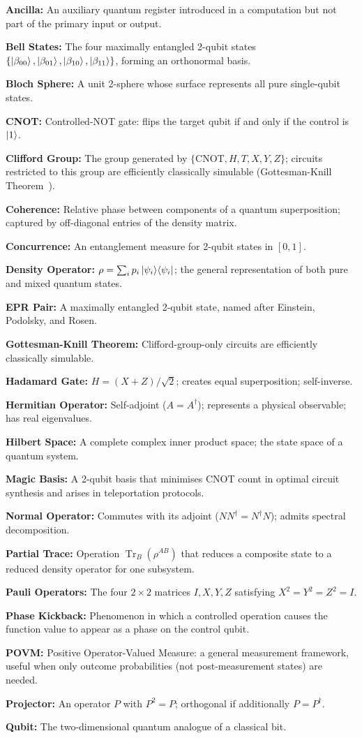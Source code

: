\documentclass[12pt, a4paper, oneside]{report}
\theoremstyle{plain}
\theoremstyle{definition}
\theoremstyle{remark}
\newcommand{\oket}[2]{\ket{#1}\!\bra{#2}}
\DeclareMathOperator{\Tr}{Tr}
\newcommand{\CNOT}{\mathrm{CNOT}}
\begin{document}
\newcommand{\gentry}[2]{\noindent\textbf{#1:} #2\medskip\par}

\gentry{Ancilla}{An auxiliary quantum register introduced in a computation but not part of
the primary input or output.}
\gentry{Bell States}{The four maximally entangled 2-qubit states
$\{\ket{\beta_{00}},\ket{\beta_{01}},\ket{\beta_{10}},\ket{\beta_{11}}\}$, forming an
orthonormal basis.}
\gentry{Bloch Sphere}{A unit 2-sphere whose surface represents all pure single-qubit states.}
\gentry{CNOT}{Controlled-NOT gate: flips the target qubit if and only if the control is
$\ket{1}$.}
\gentry{Clifford Group}{The group generated by $\{\CNOT, H, T, X, Y, Z\}$; circuits
restricted to this group are efficiently classically simulable
(Gottesman-Knill Theorem~\cite{gottesman1998}).}
\gentry{Coherence}{Relative phase between components of a quantum superposition; captured
by off-diagonal entries of the density matrix.}
\gentry{Concurrence}{An entanglement measure for 2-qubit states in $[0,1]$.}
\gentry{Density Operator}{$\rho = \sum_i p_i\oket{\psi_i}{\psi_i}$; the general
representation of both pure and mixed quantum states.}
\gentry{EPR Pair}{A maximally entangled 2-qubit state, named after Einstein, Podolsky, and
Rosen.}
\gentry{Gottesman-Knill Theorem}{Clifford-group-only circuits are efficiently classically
simulable.}
\gentry{Hadamard Gate}{$H = (X+Z)/\sqrt{2}$; creates equal superposition; self-inverse.}
\gentry{Hermitian Operator}{Self-adjoint ($A=A^\dagger$); represents a physical observable;
has real eigenvalues.}
\gentry{Hilbert Space}{A complete complex inner product space; the state space of a quantum
system.}
\gentry{Magic Basis}{A 2-qubit basis that minimises CNOT count in optimal circuit synthesis
and arises in teleportation protocols.}
\gentry{Normal Operator}{Commutes with its adjoint ($NN^\dagger = N^\dagger N$); admits
spectral decomposition.}
\gentry{Partial Trace}{Operation $\Tr_B(\rho^{AB})$ that reduces a composite state to a
reduced density operator for one subsystem.}
\gentry{Pauli Operators}{The four $2\times 2$ matrices $I, X, Y, Z$ satisfying
$X^2=Y^2=Z^2=I$.}
\gentry{Phase Kickback}{Phenomenon in which a controlled operation causes the function value
to appear as a phase on the control qubit.}
\gentry{POVM}{Positive Operator-Valued Measure: a general measurement framework, useful when
only outcome probabilities (not post-measurement states) are needed.}
\gentry{Projector}{An operator $P$ with $P^2 = P$; orthogonal if additionally $P = P^\dagger$.}
\gentry{Qubit}{The two-dimensional quantum analogue of a classical bit.}
\end{document}
